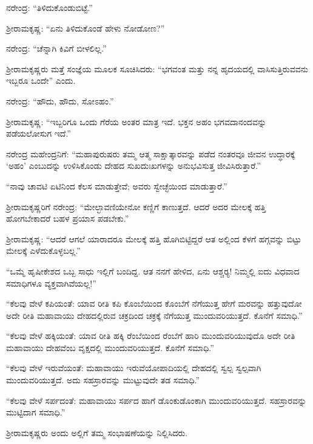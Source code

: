ನರೇಂದ್ರ: “ತಿಳಿದುಕೊಂಡುಬಿಟ್ಟೆ.”

ಶ‍್ರೀರಾಮಕೃಷ್ಣ: “ಏನು ತಿಳಿದುಕೊಂಡೆ ಹೇಳು ನೋಡೋಣ?”

ನರೇಂದ್ರ: “ಚೆನ್ನಾಗಿ ಕಿವಿಗೆ ಬೀಳಲಿಲ್ಲ.”

ಶ‍್ರೀರಾಮಕೃಷ್ಣರು ಮತ್ತೆ ಸಂಜ್ಞೆಯ ಮೂಲಕ ಸೂಚಿಸಿದರು: “ಭಗವಂತ ಮತ್ತು ನನ್ನ ಹೃದಯದಲ್ಲಿ ವಾಸಿಸುತ್ತಿರುವವನು ಇಬ್ಬರೂ ಒಂದೇ” ಎಂದು.

ನರೇಂದ್ರ: “ಹೌದು, ಹೌದು, ಸೋಽಹಂ.”

ಶ‍್ರೀರಾಮಕೃಷ್ಣ: “ಇಬ್ಬರಿಗೂ ಒಂದು ಗೆರೆಯ ಅಂತರ ಮಾತ್ರ ಇದೆ. ಭಕ್ತನ ಅಹಂ ಭಗವದಾನಂದವನ್ನು ಪಡೆಯಲೋಸುಗ ಇದೆ.”

ನರೇಂದ್ರ ಮಹೇಂದ್ರನಿಗೆ: “ಮಹಾಪುರುಷರು ತಮ್ಮ ಆತ್ಮ ಸಾಕ್ಷಾತ್ಕಾರವನ್ನು ಪಡೆದ ನಂತರವೂ ಜೀವನ ಉದ್ಧಾರಕ್ಕೆ ‘ಅಹಂ’ ಎಂಬುದನ್ನು ಉಳಿಸಿಕೊಂಡು ದೇಹದ ಸುಖದುಃಖಗಳನ್ನು ಅನುಭವಿಸುತ್ತ ಜೀವಿಸಿರುತ್ತಾರೆ.”

“ನಾವು ಚಾವಟಿ ಏಟಿನಿಂದ ಕೆಲಸ ಮಾಡುತ್ತೇವೆ; ಅವರು ಸ್ವೇಚ್ಛೆಯಿಂದ ಮಾಡುತ್ತಾರೆ.”

ಶ‍್ರೀರಾಮಕೃಷ್ಣರಿಗೆ ನರೇಂದ್ರ: “ಮೇಲ್ಛಾವಣಿಯೇನೋ ಕಣ್ಣಿಗೆ ಕಾಣುತ್ತದೆ. ಆದರೆ ಅದರ ಮೇಲಕ್ಕೆ ಹತ್ತಿ ಹೋಗಬೇಕಾದರೆ ಬಹಳ ಪ್ರಯಾಸ ಪಡಬೇಕು.”

ಶ‍್ರೀರಾಮಕೃಷ್ಣ: “ಆದರೆ ಆಗಲೆ ಯಾರಾದರೂ ಮೇಲಕ್ಕೆ ಹತ್ತಿ ಹೊಗಿಬಿಟ್ಟಿದ್ದರೆ ಆತ ಅಲ್ಲಿಂದ ಕೆಳಗೆ ಹಗ್ಗವನ್ನು ಬಿಟ್ಟು ಮೇಲಕ್ಕೆ ಎಳೆದುಕೊಳ್ಳಬಲ್ಲ.”

“ಒಮ್ಮೆ ಹೃಷೀಕೇಶದ ಒಬ್ಬ ಸಾಧು ಇಲ್ಲಿಗೆ ಬಂದಿದ್ದ. ಆತ ನನಗೆ ಹೇಳಿದ, ಏನು ಆಶ್ಚರ‍್ಯ! ನಿಮ್ಮಲ್ಲಿ ಐದು ವಿಧವಾದ ಸಮಾಧಿಗಳೂ ವ್ಯಕ್ತವಾಗಿವೆಯಲ್ಲ!”

“ಕೆಲವು ವೇಳೆ ಕಪಿಯಂತೆ: ಯಾವ ರೀತಿ ಕಪಿ ಕೊಂಬೆಯಿಂದ ಕೊಂಬೆಗೆ ನೆಗೆಯುತ್ತ ಹೇಗೆ ಮರವನ್ನು ಹತ್ತುವುದೋ ಅದೇ ರೀತಿ ಮಹಾವಾಯು ದೇಹದಲ್ಲಿರುವ ಚಕ್ರದಿಂದ ಚಕ್ರಕ್ಕೆ ನೆಗೆಯುತ್ತ ಮುಂದುವರಿಯುತ್ತದೆ. ಕೊನೆಗೆ ಸಮಾಧಿ.”

“ಕೆಲವು ವೇಳೆ ಹಕ್ಕಿಯಂತೆ: ಯಾವ ರೀತಿ ಹಕ್ಕಿ ರೆಂಬೆಯಿಂದ ರೆಂಬೆಗೆ ಹಾರಿ ಮುಂದುವರಿಯುವುದೊ ಅದೇ ರೀತಿ ಮಹಾವಾಯು ದೇಹವೆಂಬ ವೃಕ್ಷದಲ್ಲಿ ಮುಂದುವರಿಯುತ್ತದೆ. ಕೊನೆಗೆ ಸಮಾಧಿ.”

“ಕೆಲವು ವೇಳೆ ಇರುವೆಯಂತೆ: ಮಹಾವಾಯು ಇರುವೆಯೋಪಾದಿಯಲ್ಲಿ ದೇಹದಲ್ಲಿ ಸ್ವಲ್ಪ ಸ್ವಲ್ಪವಾಗಿ ಮುಂದುವರಿಯುತ್ತದೆ. ಅದು ಸಹಸ್ರಾರವನ್ನು ಮುಟ್ಟುವುದೇ ತಡ ಸಮಾಧಿ.”

“ಕೆಲವು ವೇಳೆ ಸರ್ಪದಂತೆ: ಮಹಾವಾಯು ಸರ್ಪದ ಹಾಗೆ ಡೊಂಕುಡೊಂಕಾಗಿ ಮುಂದುವರಿಯುತ್ತದೆ. ಸಹಸ್ರಾರವನ್ನು ಮುಟ್ಟಿದಾಗ ಸಮಾಧಿ.”

ಶ‍್ರೀರಾಮಕೃಷ್ಣರು ಅಂದು ಅಲ್ಲಿಗೆ ತಮ್ಮ ಸಂಭಾಷಣೆಯನ್ನು ನಿಲ್ಲಿಸಿದರು.


